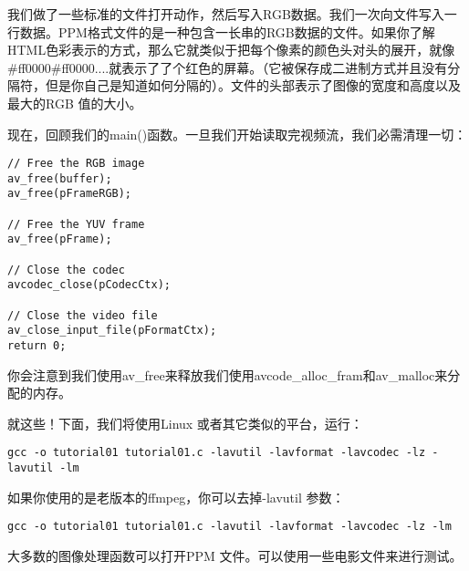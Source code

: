 我们做了一些标准的文件打开动作，然后写入RGB数据。我们一次向文件写入一行数据。PPM格式文件的是一种包含一长串的RGB数据的文件。如果你了解HTML色彩表示的方式，那么它就类似于把每个像素的颜色头对头的展开，就像\#ff0000\#ff0000....就表示了了个红色的屏幕。（它被保存成二进制方式并且没有分隔符，但是你自己是知道如何分隔的）。文件的头部表示了图像的宽度和高度以及最大的RGB 值的大小。

现在，回顾我们的main()函数。一旦我们开始读取完视频流，我们必需清理一切：
\begin{lstlisting}
// Free the RGB image
av_free(buffer);
av_free(pFrameRGB);

// Free the YUV frame
av_free(pFrame);

// Close the codec
avcodec_close(pCodecCtx);

// Close the video file
av_close_input_file(pFormatCtx);
return 0;
\end{lstlisting}

你会注意到我们使用av_free来释放我们使用avcode_alloc_fram和av_malloc来分配的内存。

就这些！下面，我们将使用Linux 或者其它类似的平台，运行：
\begin{lstlisting}
gcc -o tutorial01 tutorial01.c -lavutil -lavformat -lavcodec -lz -lavutil -lm
\end{lstlisting}

如果你使用的是老版本的ffmpeg，你可以去掉-lavutil 参数：
\begin{lstlisting}
gcc -o tutorial01 tutorial01.c -lavutil -lavformat -lavcodec -lz -lm
\end{lstlisting}

大多数的图像处理函数可以打开PPM 文件。可以使用一些电影文件来进行测试。
